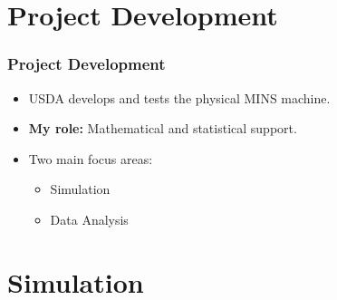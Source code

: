 \documentclass[notheorems,11pt,compress]{beamer}
\begin{document}
\section{Project Development}

\begin{frame}
\frametitle{Project Development}
\begin{itemize}
    \item USDA develops and tests the physical MINS machine.
    \item \textbf{My role:} Mathematical and statistical support.
    \item Two main focus areas:
    \begin{itemize}
        \item Simulation
        \item Data Analysis
    \end{itemize}
\end{itemize}
\end{frame}

\section{Simulation}
\end{document}
